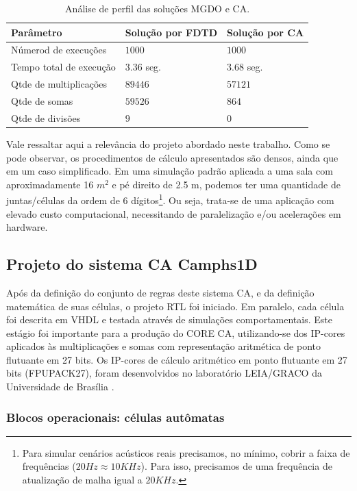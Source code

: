 \begin{table}
\centering
\caption{\label{tab:gprof} Análise de perfil das soluções MGDO e CA.}
\begin{tabular}{ |p{4.5cm}|p{4cm}|p{4cm}|  }
 \hline
Parâmetro & Solução por FDTD & Solução por CA \\
 \hline
Númerod de execuções & $1000$ & $1000$ \\
 \hline
Tempo total de execução & $3.36$ seg. & $3.68$ seg. \\
 \hline
Qtde de multiplicações & $89446$ & $57121$ \\
 \hline
Qtde de somas & $59526$ & $864$ \\
 \hline
Qtde de divisões & $9$ & $0$ \\
 \hline
\end{tabular}
\end{table}

Vale ressaltar aqui a relevância do projeto abordado neste trabalho. Como se pode observar, os procedimentos de cálculo apresentados são densos, ainda que em um caso simplificado. Em uma simulação padrão aplicada a uma sala com aproximadamente 16 $m^2$ e pé direito de 2.5 m, podemos ter uma quantidade de juntas/células da ordem de 6 dígitos\footnote{Para simular cenários acústicos reais precisamos, no mínimo, cobrir a faixa de frequências ($20Hz \approx 10KHz$). Para isso, precisamos de uma frequência de atualização de malha igual a $20KHz$.}. Ou seja, trata-se de uma aplicação com elevado custo computacional, necessitando de paralelização e/ou acelerações em hardware.

\subsection{Projeto do sistema CA Camphs1D}

Após da definição do conjunto de regras deste sistema CA, e da definição matemática de suas células, o projeto RTL foi iniciado. Em paralelo, cada célula foi descrita em VHDL e testada através de simulações comportamentais. Este estágio foi importante para a produção do CORE CA, utilizando-se dos IP-cores aplicados às multiplicações e somas com representação aritmética de ponto flutuante em 27 bits. Os IP-cores de cálculo aritmético em ponto flutuante em 27 bits (FPUPACK27), foram desenvolvidos no
laboratório LEIA/GRACO da Universidade de Brasília
\cite{Munoz} \cite{Munoz_2}.

\subsubsection{Blocos operacionais: células autômatas}

